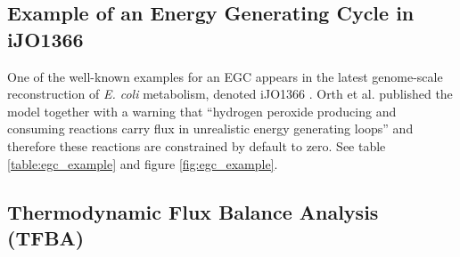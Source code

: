 \documentclass[twocolumn]{article}
\begin{document}
\subsection*{Example of an Energy Generating Cycle in iJO1366}
One of the well-known examples for an EGC appears in the latest genome-scale reconstruction of \emph{E. coli} metabolism, denoted iJO1366 \cite{Orth2011-qi}. Orth et al. published the model together with a warning that ``hydrogen peroxide producing and consuming reactions carry flux in unrealistic energy generating loops'' and therefore these reactions are constrained by default to zero. 
See table \ref{table:egc_example} and figure \ref{fig:egc_example}.

\subsection*{Thermodynamic Flux Balance Analysis (TFBA)}
\end{document}
